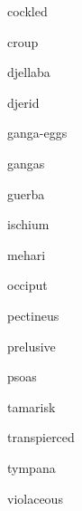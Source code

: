
cockled

croup

djellaba

djerid

ganga-eggs

gangas

guerba

ischium

mehari

occiput

pectineus

prelusive

psoas

tamarisk

transpierced

tympana

violaceous